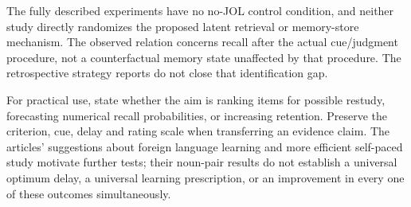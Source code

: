 The fully described experiments have no no-JOL control condition, and neither study directly
randomizes the proposed latent retrieval or memory-store mechanism.
The observed relation concerns recall after the actual cue/judgment
procedure, not a counterfactual memory state unaffected by that procedure.
The retrospective strategy reports do not close that identification gap.

For practical use, state whether the aim is ranking items for possible
restudy, forecasting numerical recall probabilities, or increasing
retention. Preserve the criterion, cue, delay and rating scale when
transferring an evidence claim. The articles' suggestions about foreign
language learning and more efficient self-paced study motivate further
tests; their noun-pair results do not establish a universal optimum
delay, a universal learning prescription, or an improvement in every
one of these outcomes simultaneously.
